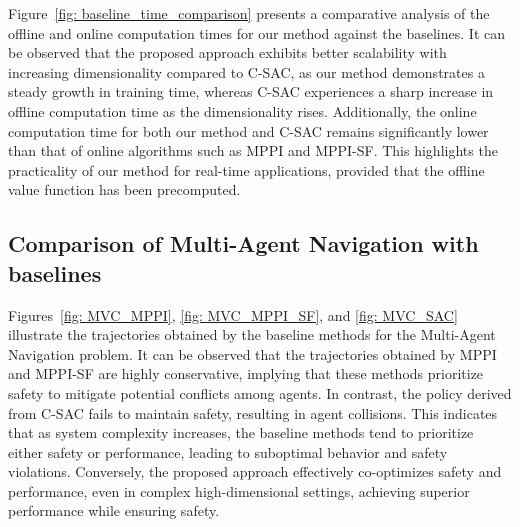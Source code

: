 Figure~\ref{fig: baseline_time_comparison} presents a comparative analysis of the offline and online computation times for our method against the baselines. It can be observed that the proposed approach exhibits better scalability with increasing dimensionality compared to C-SAC, as our method demonstrates a steady growth in training time, whereas C-SAC experiences a sharp increase in offline computation time as the dimensionality rises. Additionally, the online computation time for both our method and C-SAC remains significantly lower than that of online algorithms such as MPPI and MPPI-SF. This highlights the practicality of our method for real-time applications, provided that the offline value function has been precomputed.

\subsection{Comparison of Multi-Agent Navigation with baselines}\label{app: MVC_baselines}

Figures~\ref{fig: MVC_MPPI}, \ref{fig: MVC_MPPI_SF}, and \ref{fig: MVC_SAC} illustrate the trajectories obtained by the baseline methods for the Multi-Agent Navigation problem. It can be observed that the trajectories obtained by MPPI and MPPI-SF are highly conservative, implying that these methods prioritize safety to mitigate potential conflicts among agents. In contrast, the policy derived from C-SAC fails to maintain safety, resulting in agent collisions. This indicates that as system complexity increases, the baseline methods tend to prioritize either safety or performance, leading to suboptimal behavior and safety violations. Conversely, the proposed approach effectively co-optimizes safety and performance, even in complex high-dimensional settings, achieving superior performance while ensuring safety.

